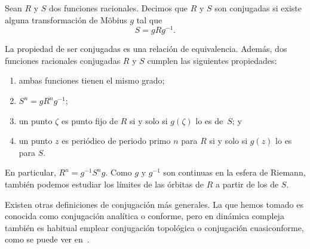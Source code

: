 \begin{definicion}
  Sean $R$ y $S$ dos funciones racionales. Decimos que $R$ y $S$ son conjugadas
  si existe alguna transformación de Möbius $g$ tal que
  \begin{equation*}
    S = g R g^{-1}.
  \end{equation*}
\end{definicion}

La propiedad de ser conjugadas es una relación de equivalencia. Además, dos
funciones racionales conjugadas $R$ y $S$ cumplen las siguientes propiedades:
\begin{enumerate}[label=(\arabic*)]
  \item ambas funciones tienen el mismo grado;
  \item $S^n = g R^n g^{-1}$;
  \item un punto $\zeta$ es punto fijo de $R$ si y solo si $g(\zeta)$ lo es
        de~$S$; y
  \item un punto $z$ es periódico de periodo primo $n$ para $R$ si y solo si
        $g(z)$ lo es para $S$.
\end{enumerate}

En particular, $R^n=g^{-1}S^ng$. Como $g$ y $g^{-1}$ son continuas en la esfera
de Riemann, también podemos estudiar los límites de las órbitas de $R$ a partir
de los de $S$.

Existen otras definiciones de conjugación más generales. La que hemos tomado es
conocida como conjugación analítica o conforme, pero en dinámica compleja
también es habitual emplear conjugación topológica o conjugación cuasiconforme,
como se puede ver en~\cite{Beardon1991}.

